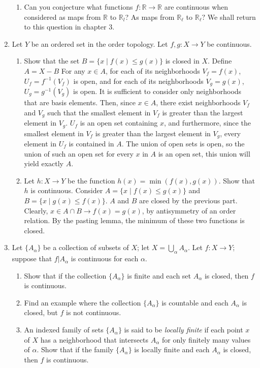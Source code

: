 \documentclass[12pt,letterpaper]{article}
\newcommand{\n}{\break}
\begin{document}
\begin{enumerate}
\begin{enumerate}
    \item Can you conjecture what functions $f:\mathbb{R}\rightarrow \mathbb{R}$ are continuous when considered as maps from $\mathbb{R}$ to $\mathbb{R}_l$? As maps from $\mathbb{R}_\ell$ to $\mathbb{R}_\ell?$ We shall return to this question in chapter 3.
  \end{enumerate}
  \item Let $Y$ be an ordered set in the order topology. Let $f,g: X\rightarrow Y$ be continuous.
  \begin{enumerate}
    \item Show that the set $B=\{x\;|\; f(x)\leq g(x)\}$ is closed in $X$.\hspace{5in}\n
    \indent Define $A=X-B$ For any $x\in A$, for each of its neighborhoods $V_f=f(x)$, $U_f=f^{-1}(V_f)$ is open, and for each of its neighborhoods $V_g=g(x)$, $U_g=g^{-1}(V_g)$ is open. It is sufficient to consider only neighborhoods that are basis elements. Then, since $x\in A$, there exist neighborhoods $V_f$ and $V_g$ such that the smallest element in $V_f$ is greater than the largest element in $V_g$. $U_f$ is an open set containing $x$, and furthermore, since the smallest element in $V_f$ is greater than the largest element in $V_g$, every element in $U_f$ is contained in $A$. The union of open sets is open, so the union of such an open set for every $x$ in $A$ is an open set, this union will yield exactly $A$.
    \item Let $h: X\rightarrow Y$ be the function $h(x)=\min(f(x),g(x))$. Show that $h$ is continuous.\hspace{5in}\n
    \indent Consider $A=\{x\;|\; f(x)\leq g(x)\}$ and $B=\{x\;|\; g(x)\leq f(x)\}$. $A$ and $B$ are closed by the previous part. Clearly, $x\in A\cap B\rightarrow f(x)=g(x)$, by antisymmetry of an order relation. By the pasting lemma, the minimum of these two functions is closed.
  \end{enumerate}
  \item Let $\{A_\alpha \}$ be a collection of subsets of $X$; let $X=\bigcup_\alpha A_\alpha$. Let $f: X\rightarrow Y$; suppose that $f|A_\alpha$ is continuous for each $\alpha$.
  \begin{enumerate}
    \item Show that if the collection $\{A_\alpha\}$ is finite and each set $A_\alpha$ is closed, then $f$ is continuous.\hspace{5in}\n
    \item Find an example where the collection $\{A_\alpha\}$ is countable and each $A_\alpha$ is closed, but $f$ is not continuous. \hspace{5in}\n
    \item An indexed family of sets $\{A_\alpha\}$ is said to be \emph{locally finite} if each point $x$ of $X$ has a neighborhood that intersects $A_\alpha$ for only finitely many values of $\alpha$. Show that if the family $\{A_\alpha\}$ is locally finite and each $A_\alpha$ is closed, then $f$ is continuous.\hspace{5in}\n
  \end{enumerate}
\end{enumerate}
\end{document}

